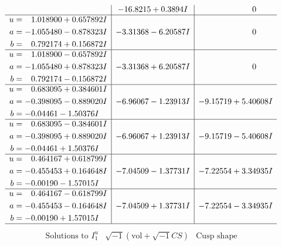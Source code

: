 \documentclass[1p]{elsarticle_modified}
\theoremstyle{definition}
\newcommand{\I}{\sqrt{-1}}
\begin{document}
$$\begin{array}{c|c|c}
 & -16.8215 + 0.3894 I & \phantom{-0.000000 } 0 \\ \hline\begin{aligned}
u &= \phantom{-}1.018900 + 0.657892 I \\
a &= -1.055480 - 0.878323 I \\
b &= \phantom{-}0.792174 + 0.156872 I\end{aligned}
 & -3.31368 - 6.20587 I & \phantom{-0.000000 } 0 \\ \hline\begin{aligned}
u &= \phantom{-}1.018900 - 0.657892 I \\
a &= -1.055480 + 0.878323 I \\
b &= \phantom{-}0.792174 - 0.156872 I\end{aligned}
 & -3.31368 + 6.20587 I & \phantom{-0.000000 } 0 \\ \hline\begin{aligned}
u &= \phantom{-}0.683095 + 0.384601 I \\
a &= -0.398095 - 0.889020 I \\
b &= -0.04461 - 1.50376 I\end{aligned}
 & -6.96067 - 1.23913 I & -9.15719 + 5.40608 I \\ \hline\begin{aligned}
u &= \phantom{-}0.683095 - 0.384601 I \\
a &= -0.398095 + 0.889020 I \\
b &= -0.04461 + 1.50376 I\end{aligned}
 & -6.96067 + 1.23913 I & -9.15719 - 5.40608 I \\ \hline\begin{aligned}
u &= \phantom{-}0.464167 + 0.618799 I \\
a &= -0.455453 + 0.164648 I \\
b &= -0.00190 - 1.57015 I\end{aligned}
 & -7.04509 - 1.37731 I & -7.22554 + 3.34935 I \\ \hline\begin{aligned}
u &= \phantom{-}0.464167 - 0.618799 I \\
a &= -0.455453 - 0.164648 I \\
b &= -0.00190 + 1.57015 I\end{aligned}
 & -7.04509 + 1.37731 I & -7.22554 - 3.34935 I\\
 \hline 
 \end{array}$$\newpage$$\begin{array}{c|c|c}  
\text{Solutions to }I^u_{1}& \I (\text{vol} + \sqrt{-1}CS) & \text{Cusp shape}\\

\end{array}$$
\end{document}
